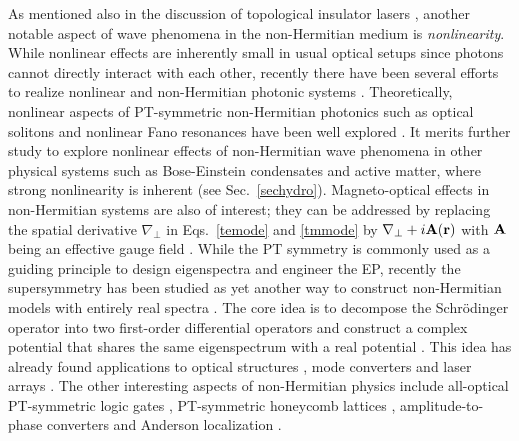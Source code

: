 \documentclass{tADP2e}
\theoremstyle{plain}
\theoremstyle{plain}
\theoremstyle{definition}
\begin{document}
As mentioned also in the discussion of topological insulator lasers \cite{HG18,BM18}, another notable aspect of wave phenomena in the non-Hermitian medium is \emph{nonlinearity}. While nonlinear effects are inherently small in usual optical setups since photons cannot directly interact with each other, recently there have been several efforts to realize nonlinear and non-Hermitian photonic systems \cite{BP14,WMM15}. 
Theoretically, nonlinear aspects of PT-symmetric non-Hermitian photonics such as  optical solitons and nonlinear Fano resonances \cite{FU61} have been well explored \cite{MZH08,AFK11,MAE11,KVV16}. It merits further study to explore nonlinear effects of non-Hermitian wave phenomena in other physical systems such as Bose-Einstein condensates and active matter, where  strong nonlinearity is inherent (see Sec.~\ref{sechydro}).
Magneto-optical effects in non-Hermitian systems are also of interest; they can be addressed by replacing the spatial derivative $\nabla_\perp$ in Eqs.~\eqref{temode} and \eqref{tmmode} by $\nabla_\perp+i{\bf A}({\bf r})$ with $\bf A$ being an effective gauge field \cite{PH11}. 
While the PT symmetry is commonly used as a guiding principle to design eigenspectra and engineer the EP, recently the supersymmetry has been studied as yet another way to construct non-Hermitian models with entirely real spectra \cite{FC95}. The core idea is to decompose the Schr{\"o}dinger operator into two first-order differential operators and construct a complex potential that shares the same eigenspectrum with a real potential \cite{KA89}. This idea has already found applications to optical structures \cite{MMA13}, mode converters \cite{HM14} and laser arrays \cite{EGR15}.
The other interesting aspects of non-Hermitian physics include all-optical PT-symmetric logic gates \cite{DS15}, PT-symmetric honeycomb lattices \cite{SA112}, amplitude-to-phase converters \cite{Gutierrez:16} and Anderson localization \cite{DMJ12}. 
\end{document}
